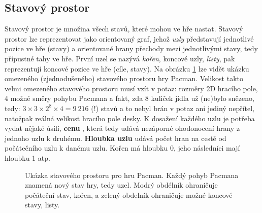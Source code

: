 \subsection*{Stavový prostor}
Stavový prostor \cite{AI1} je množina všech stavů, které mohou ve hře nastat. Stavový prostor lze reprezentovat jako orientovaný graf, jehož \textit{uzly} představují jednotlivé pozice ve hře (stavy) a orientované hrany přechody mezi jednotlivými stavy, tedy přípustné tahy ve hře. První uzel se nazývá \textit{kořen}, koncové uzly, \textit{listy}, pak reprezentují koncové pozice ve hře (cíle, stavy). Na obrázku \ref{img:stavp} lze vidět ukázku omezeného (zjednodušeného) stavového prostoru hry Pacman. Velikost takto velmi omezeného stavového prostoru musí vzít v potaz: rozměry 2D hracího pole, 4 možné směry pohybu Pacmana a fakt, zda 8 kuliček jídla už (ne)bylo snězeno, tedy:  $3 \times 3 \times 2^{8} \times 4 = 9\:216$ (!) stavů a to nebyl brán v potaz ani jediný nepřítel, natožpak reálná velikost hracího pole desky.
\newline
K dosažení každého uzlu je potřeba vydat nějaké úsilí, \textbf{cenu} \cite{AI1}, která tedy udává nezáporné ohodonocení hrany z jednoho uzlu k druhému. \textbf{Hloubka uzlu} \cite{AI1} udává počet hran na cestě od počátečního uzlu k danému uzlu. Kořen má hloubku 0, jeho následníci mají hloubku 1 atp.


\begin{figure}[h]
\begin{center}
  \caption{Ukázka stavového prostoru pro hru Pacman. Každý pohyb Pacmana znamená nový stav hry, tedy uzel. Modrý obdélník ohraničuje počáteční stav, kořen, a zelený obdelník ohraničuje možné koncové stavy, listy.}
  \label{img:stavp}
\end{center}
\end{figure}

